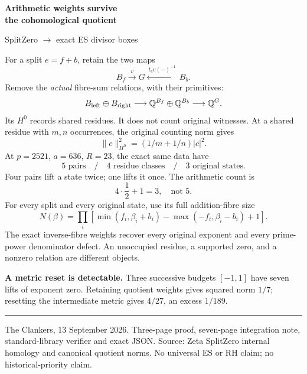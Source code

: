 \documentclass[11pt]{article}
\begin{document}
\begin{center}
{\Large\bfseries Arithmetic weights survive\\the cohomological quotient}\par\vspace{3mm}
{\small SplitZero $\longrightarrow$ exact ES divisor boxes}
\end{center}
For a split $e=f+b$, retain the two maps
\[
 B_f\xrightarrow{v}G\xleftarrow{\ t_cv(-)^{-1}\ }B_b.
\]
Remove the \emph{actual} fibre-sum relations, with their primitives:
\[
 B_{\rm left}\oplus B_{\rm right}
 \longrightarrow\mathbb Q^{B_f}\oplus\mathbb Q^{B_b}
 \longrightarrow\mathbb Q^G.
\]
Its $H^0$ records shared residues. It does not count original witnesses.
At a shared residue with $m,n$ occurrences, the original counting norm gives
\[
 \boxed{\|c\|_{H^0}^2=(1/m+1/n)|c|^2.}
\]
At $p=2521$, $a=636$, $R=23$, the exact same data have
\[
 \boxed{5\text{ pairs}\quad /\quad4\text{ residue classes}\quad /\quad 3\text{ original states}.}
\]
Four pairs lift a state twice; one lifts it once. The arithmetic count is
\[
 \boxed{4\cdot\frac12+1=3,\quad\text{not }5.}
\]
For every split and every original state, use its full addition-fibre size
\[
 N(\beta)=\prod_i\left[
 \min(f_i,\beta_i+b_i)-\max(-f_i,\beta_i-b_i)+1\right].
\]
The exact inverse-fibre weights recover every original exponent and every
prime-power denominator defect. An unoccupied residue, a supported zero,
and a nonzero relation are different objects.\par\vspace{2mm}
\textbf{A metric reset is detectable.} Three successive budgets $[-1,1]$
have seven lifts of exponent zero. Retaining quotient weights gives squared norm
$1/7$; resetting the intermediate metric gives $4/27$, an excess $1/189$.

\vfill
\hrule\smallskip
{\small The Clankers, 13 September 2026. Three-page proof, seven-page
integration note, standard-library verifier and exact JSON. Source:
Zeta SplitZero internal homology and canonical quotient norms.
No universal ES or RH claim; no historical-priority claim.}
\end{document}
